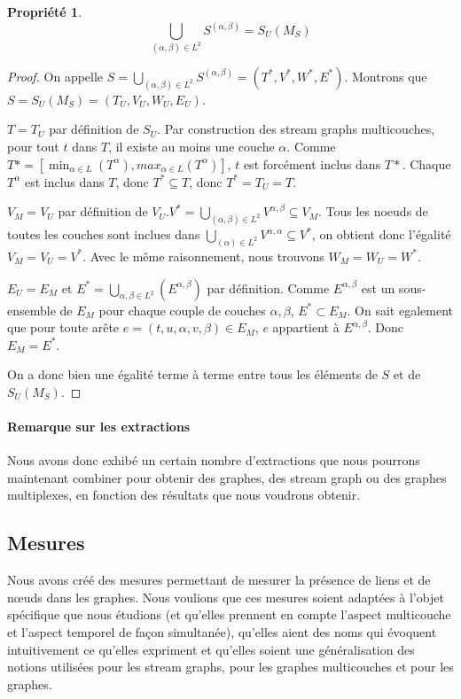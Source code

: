 \documentclass[11pt,a4paper]{article}
\newtheorem{prop}{Propriété}
\theoremstyle{definition}
\theoremstyle{remark}
\theoremstyle{remark}
\def \stg {stream graph}
\def \stgms {stream graphs multicouches}
\begin{document}
		
	\begin{prop}
		\[
			\bigcup_{(\alpha,\beta) \in L^2} S^{(\alpha,\beta)} = S_U(M_S)
		\]
	\end{prop}
	\begin{proof}
	On appelle $S=\bigcup_{(\alpha,\beta) \in L^2} S^{(\alpha,\beta)}=(T^{*},V^{*},W^{*},E^{*})$. Montrons que $S=S_U(M_S)= (T_U,V_U,W_U,E_U)$.
	
	$T=T_U$ par définition de $S_U$. Par construction des \stgms{}, pour tout $t$ dans $T$, il existe au moins une couche $\alpha$. Comme $T* = [\min_{\alpha \in L} (T^{\alpha}),max_{\alpha \in L} (T^{\alpha})]$, $t$ est forcément inclus dans $T*$. Chaque $T^{\alpha}$ est inclus dans $T$, donc $T^* \subseteq T$, donc $T^*=T_U=T$.
	
	$V_M = V_U$ par définition de $V_U$.$V^{*}=\bigcup_{(\alpha,\beta) \in L^2} V^{\alpha,\beta} \subseteq V_M$. Tous les noeuds de toutes les couches sont inclues dans $\bigcup_{(\alpha) \in L^2} V^{\alpha,\alpha} \subseteq V^{*}$, on obtient donc l'égalité $V_M=V_U=V^*$.
	Avec le même raisonnement, nous trouvons $W_M=W_U=W^*$.
	
	$E_U=E_M$ et $E^{*}=\bigcup_{\alpha,\beta \in L^2}(E^{\alpha,\beta})$ par définition. Comme $E^{\alpha,\beta}$ est un sous-ensemble de $E_M$ pour chaque couple de couches $\alpha,\beta$, $E^{*} \subset E_M$. On sait egalement que pour toute arête $e =(t,u,\alpha,v,\beta) \in E_M$, $e$ appartient à $E^{\alpha,\beta}$. Donc $E_M=E^{*}$.


On a donc bien une égalité terme à terme entre tous les éléments de $S$ et de $S_U(M_S)$.					
	\end{proof}

\paragraph{Remarque sur les extractions}
Nous avons donc exhibé un certain nombre d'extractions que nous pourrons maintenant combiner pour obtenir des graphes, des \stg{} ou des graphes multiplexes, en fonction des résultats que nous voudrons obtenir.

\subsection{Mesures}


Nous avons créé des mesures permettant de mesurer la présence de liens et de nœuds dans les graphes. Nous voulions que ces mesures soient adaptées à l'objet spécifique que nous étudions (et qu'elles prennent en compte l'aspect multicouche et l'aspect temporel de façon simultanée), qu'elles aient des noms qui évoquent intuitivement ce qu'elles expriment et qu'elles soient une généralisation des notions utilisées pour les stream graphs, pour les graphes multicouches et pour les graphes.
\end{document}
